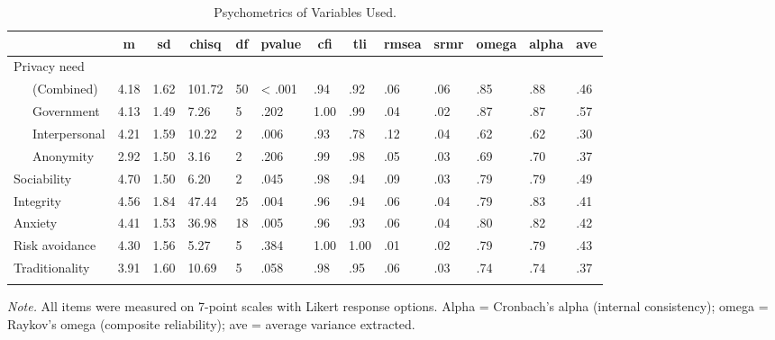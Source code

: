 \documentclass[man,floatsintext]{apa6}
\begin{document}
\begin{table}[tbp]
\begin{center}
\begin{threeparttable}
\caption{\label{tab:psychometrics}Psychometrics of Variables Used.}
\footnotesize{
\begin{tabular}{lllllllllllll}
\toprule
 & \multicolumn{1}{c}{m} & \multicolumn{1}{c}{sd} & \multicolumn{1}{c}{chisq} & \multicolumn{1}{c}{df} & \multicolumn{1}{c}{pvalue} & \multicolumn{1}{c}{cfi} & \multicolumn{1}{c}{tli} & \multicolumn{1}{c}{rmsea} & \multicolumn{1}{c}{srmr} & \multicolumn{1}{c}{omega} & \multicolumn{1}{c}{alpha} & \multicolumn{1}{c}{ave}\\
\midrule
Privacy need &  &  &  &  &  &  &  &  &  &  &  & \\
\ \ \ (Combined) & 4.18 & 1.62 & 101.72 & 50 & < .001 & .94 & .92 & .06 & .06 & .85 & .88 & .46\\
\ \ \ Government & 4.13 & 1.49 & 7.26 & 5 & .202 & 1.00 & .99 & .04 & .02 & .87 & .87 & .57\\
\ \ \ Interpersonal & 4.21 & 1.59 & 10.22 & 2 & .006 & .93 & .78 & .12 & .04 & .62 & .62 & .30\\
\ \ \ Anonymity & 2.92 & 1.50 & 3.16 & 2 & .206 & .99 & .98 & .05 & .03 & .69 & .70 & .37\\
Sociability & 4.70 & 1.50 & 6.20 & 2 & .045 & .98 & .94 & .09 & .03 & .79 & .79 & .49\\
Integrity & 4.56 & 1.84 & 47.44 & 25 & .004 & .96 & .94 & .06 & .04 & .79 & .83 & .41\\
Anxiety & 4.41 & 1.53 & 36.98 & 18 & .005 & .96 & .93 & .06 & .04 & .80 & .82 & .42\\
Risk avoidance & 4.30 & 1.56 & 5.27 & 5 & .384 & 1.00 & 1.00 & .01 & .02 & .79 & .79 & .43\\
Traditionality & 3.91 & 1.60 & 10.69 & 5 & .058 & .98 & .95 & .06 & .03 & .74 & .74 & .37\\
\bottomrule
\addlinespace
\end{tabular}
}
\begin{tablenotes}[para]
\normalsize{\textit{Note.} All items were measured on 7-point scales with Likert response options. Alpha = Cronbach's alpha (internal consistency); omega = Raykov's omega (composite reliability); ave = average variance extracted.}
\end{tablenotes}
\end{threeparttable}
\end{center}
\end{table}
\end{document}
